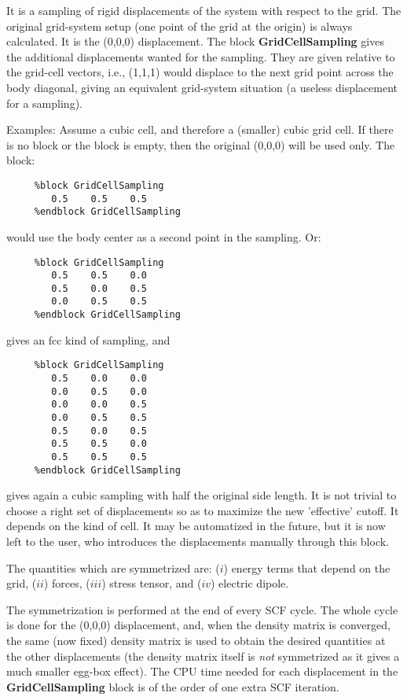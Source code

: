 \documentclass[11pt]{article}
\begin{document}
\begin{description}
It is a sampling of rigid displacements of the system with respect
to the grid. The original grid-system setup (one point of the grid
at the origin) is always calculated. It is the (0,0,0) displacement. 
The block {\bf GridCellSampling} gives the additional displacements
wanted for the sampling. They are given relative to the grid-cell 
vectors, i.e., (1,1,1) would displace to the next grid point across
the body diagonal, giving an equivalent grid-system situation
(a useless displacement for a sampling).

Examples: Assume a cubic cell, and therefore a (smaller) cubic grid cell.
If there is no block or the block is empty, then the original (0,0,0)
will be used only. The block: 

\begin{verbatim}
     %block GridCellSampling
        0.5    0.5    0.5
     %endblock GridCellSampling
\end{verbatim}

would use the body center as a second point in the sampling. Or:


\begin{verbatim}
     %block GridCellSampling
        0.5    0.5    0.0
        0.5    0.0    0.5
        0.0    0.5    0.5
     %endblock GridCellSampling
\end{verbatim}

gives an fcc kind of sampling, and

\begin{verbatim}
     %block GridCellSampling
        0.5    0.0    0.0
        0.0    0.5    0.0
        0.0    0.0    0.5
        0.0    0.5    0.5
        0.5    0.0    0.5
        0.5    0.5    0.0
        0.5    0.5    0.5
     %endblock GridCellSampling
\end{verbatim}

gives again a cubic sampling with half the original side length.
It is not trivial to choose a right set of displacements so as
to maximize the new 'effective' cutoff. It depends on the 
kind of cell. It may be automatized in the future, but it 
is now left to the user, who introduces the displacements
manually through this block.

The quantities which are symmetrized are: ($i$) energy terms
that depend on the grid, ($ii$) forces, ($iii$) stress
tensor, and ($iv$) electric dipole.

The symmetrization is performed at the end of every SCF cycle. The 
whole cycle is done for the (0,0,0) displacement, and, when the
density matrix is converged, the same (now fixed)
density matrix is used to obtain the desired quantities at the 
other displacements (the density matrix itself is {\it not}
symmetrized as it gives a much smaller egg-box effect).
The CPU time needed for each displacement
in the {\bf GridCellSampling} block
is of the order of one extra SCF iteration.


\end{description}
\end{document}
